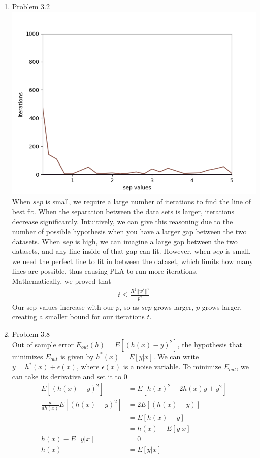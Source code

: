 \documentclass{article}
\begin{document}
\begin{enumerate}
        \item Problem 3.2\\
        \includegraphics[scale=0.5]{images/p3_2.png}\\
        When $sep$ is small, we require a large number of iterations to find the line of best fit. When the separation between the data sets is larger, iterations decrease significantly. Intuitively, we can give this reasoning due to the number of possible hypothesis when you have a larger gap between the two datasets. When $sep$ is high, we can imagine a large gap between the two datasets, and any line inside of that gap can fit. However, when $sep$ is small, we need the perfect line to fit in between the dataset, which limits how many lines are possible, thus causing PLA to run more iterations.\\[0.25in]
        Mathematically, we proved that
        \begin{align*}
            t \leq \frac{R^2 ||w^*||^2}{p^2}
        \end{align*}
        Our sep values increase with our $p$, so as $sep$ grows larger, $p$ grows larger, creating a smaller bound for our iterations $t$.

        \item Problem 3.8\\
        Out of sample error $E_{out}(h) = E[(h(x) - y)^2]$, the hypothesis that minimizes $E_{out}$ is given by $h^*(x) = E[y|x]$. We can write $y = h^*(x) + \epsilon (x)$, where $\epsilon (x)$ is a noise variable. To minimize $E_{out}$, we can take its derivative and set it to 0
        \begin{align*}
            E[(h(x) - y)^2] &= E[h(x)^2 - 2h(x)y + y^2]\\
            \frac{d}{dh(x)}E[(h(x) - y)^2] &= 2E[(h(x) - y)]\\
            &= E[h(x) - y]\\
            &= h(x) - E[y|x]\\
            h(x) - E[y|x] &= 0\\
            h(x) &= E[y|x]
        \end{align*}


\end{enumerate}
\end{document}
